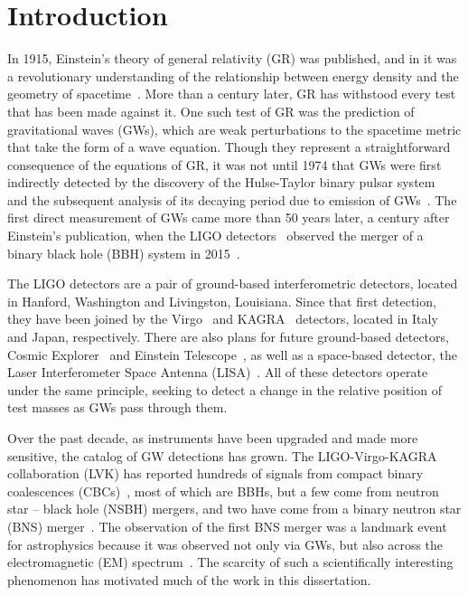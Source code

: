 \chapter{Introduction}
\label{intro_chapter}

\begin{refsection}

In 1915, Einstein's theory of general relativity (GR) was published, and in it was a revolutionary understanding of the relationship between energy density and the geometry of spacetime~\cite{Einstein:1916vd}.
More than a century later, GR has withstood every test that has been made against it.
One such test of GR was the prediction of gravitational waves (GWs), which are weak perturbations to the spacetime metric that take the form of a wave equation.
Though they represent a straightforward consequence of the equations of GR, it was not until 1974 that GWs were first indirectly detected by the discovery of the Hulse-Taylor binary pulsar system~\cite{HuTa1975} and the subsequent analysis of its decaying period due to emission of GWs~\cite{TaWe1982}.
The first direct measurement of GWs came more than 50 years later, a century after Einstein's publication, when the LIGO detectors~\cite{Aasi_2015} observed the merger of a binary black hole (BBH) system in 2015~\cite{AbEA2016a}.

The LIGO detectors are a pair of ground-based interferometric detectors, located in Hanford, Washington and Livingston, Louisiana.
Since that first detection, they have been joined by the Virgo~\cite{Acernese_2015} and KAGRA~\cite{kagra} detectors, located in Italy and Japan, respectively.
There are also plans for future ground-based detectors, Cosmic Explorer~\cite{Evans_2021} and Einstein Telescope~\cite{Punturo_2010}, as well as a space-based detector, the Laser Interferometer Space Antenna (LISA)~\cite{LISA2000}.
All of these detectors operate under the same principle, seeking to detect a change in the relative position of test masses as GWs pass through them.

Over the past decade, as instruments have been upgraded and made more sensitive, the catalog of GW detections has grown.
The LIGO-Virgo-KAGRA collaboration (LVK) has reported hundreds of signals from compact binary coalescences (CBCs)~\cite{LIGOScientific:2025slb}, most of which are BBHs, but a few come from neutron star -- black hole (NSBH) mergers, and two have come from a binary neutron star (BNS) merger~\cite{AbEA2017b, Abbott_2020_bns}.
The observation of the first BNS merger was a landmark event for astrophysics because it was observed not only via GWs, but also across the electromagnetic (EM) spectrum~\cite{AbEA2017f}.
The scarcity of such a scientifically interesting phenomenon has motivated much of the work in this dissertation.


\end{refsection}
